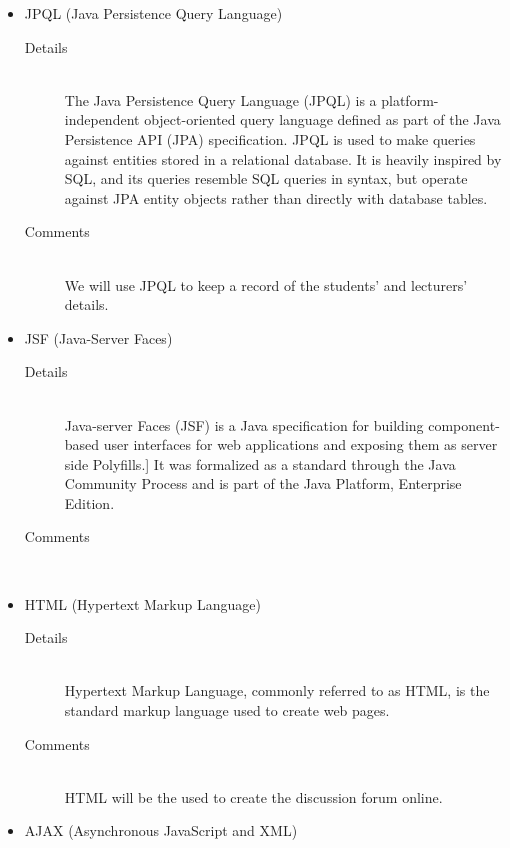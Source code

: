 \documentclass[10pt]{article}
\begin{document}
\begin{description}
\begin{itemize}
\begin{description}
					\end{description}
				\item JPQL (Java Persistence Query Language)
					\begin{description}
						\item[Details] \hfill \\
							The Java Persistence Query Language (JPQL) is a platform-independent object-oriented query language defined as part
							 of the Java Persistence API (JPA) specification. JPQL is used to make queries against entities stored in a relational database.
							 It is heavily inspired by SQL, and its queries resemble SQL queries in syntax, but operate against JPA entity objects rather
							 than directly with database tables.
						\item[Comments]\hfill \\
                                                        We will use JPQL to keep a record of the students' and lecturers' details.							
					\end{description}
				\item JSF (Java-Server Faces)
					\begin{description}
						\item[Details] \hfill \\
							Java-server Faces (JSF) is a Java specification for building component-based user interfaces for web applications and
							 exposing them as server side Polyfills.] It was formalized as a standard through the Java Community Process and is
							 part of the Java Platform, Enterprise Edition.
						\item[Comments]\hfill \\	
					\end{description}
				\item HTML (Hypertext Markup Language)
					\begin{description}
						\item[Details] \hfill \\
							Hypertext Markup Language, commonly referred to as HTML, is the standard markup language used to create web pages.
						\item[Comments]\hfill \\
                                                        HTML will be the used to create the discussion forum online.			
					\end{description}
				\item AJAX (Asynchronous JavaScript and XML)
					\begin{description}

\end{description}
\end{itemize}
\end{description}
\end{document}
